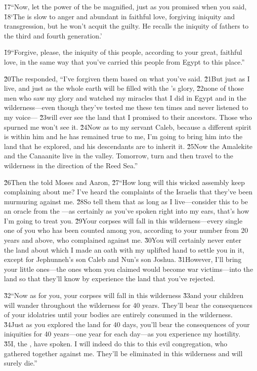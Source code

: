 \v{17}``Now, let the power of the  be magnified, just as you promised when you said, \v{18}`The  is slow to anger and abundant in faithful love, forgiving iniquity and transgression, but he won't acquit the guilty. He recalls the iniquity of fathers to the third and fourth generation.'

\v{19}``Forgive, please, the iniquity of this people, according to your great, faithful love, in the same way that you've carried this people from Egypt to this place.''

\v{20}The  responded, ``I've forgiven them based on what you've said. \v{21}But just as I live, and just as the whole earth will be filled with the 's glory, \v{22}none of those men who saw my glory and watched my miracles that I did in Egypt and in the wilderness---even though they've tested me these ten times and never listened to my voice--- \v{23}will ever see the land that I promised to their ancestors. Those who spurned me won't see it. \v{24}Now as to my servant Caleb, because a different spirit is within him and he has remained true to me, I'm going to bring him into the land that he explored, and his descendants are to inherit it. \v{25}Now the Amalekite and the Canaanite live in the valley. Tomorrow, turn and then travel to the wilderness in the direction of the Reed Sea.''

\v{26}Then the  told Moses and Aaron, \v{27}``How long will this wicked assembly keep complaining about me? I've heard the complaints of the Israelis that they've been murmuring against me. \v{28}So tell them that as long as I live---consider this to be an oracle from the ---as certainly as you've spoken right into my ears, that's how I'm going to treat you. \v{29}Your corpses will fall in this wilderness---every single one of you who has been counted among you, according to your number from 20 years and above, who complained against me. \v{30}You will certainly never enter the land about which I made an oath with my uplifted hand to settle you in it, except for Jephunneh's son Caleb and Nun's son Joshua. \v{31}However, I'll bring your little ones---the ones whom you claimed would become war victims---into the land so that they'll know by experience the land that you've rejected.

\v{32}``Now as for you, your corpses will fall in this wilderness \v{33}and your children will wander throughout the wilderness for 40 years. They'll bear the consequences of your idolatries until your bodies are entirely consumed in the wilderness. \v{34}Just as you explored the land for 40 days, you'll bear the consequences of your iniquities for 40 years---one year for each day---as you experience my hostility. \v{35}I, the , have spoken. I will indeed do this to this evil congregation, who gathered together against me. They'll be eliminated in this wilderness and will surely die.''

